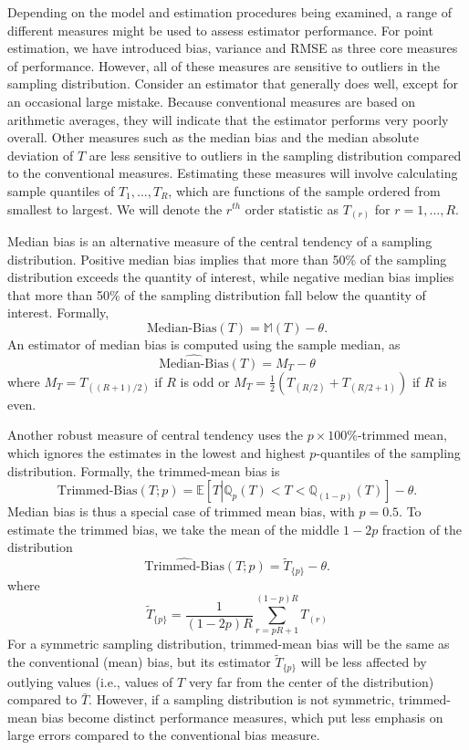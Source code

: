 \documentclass[
]{book}
\newcommand{\E}{\mathbb{E}}
\newcommand{\M}{\mathbb{M}}
\newcommand{\Q}{\mathbb{Q}}
\begin{document}
Depending on the model and estimation procedures being examined, a range of different measures might be used to assess estimator performance.
For point estimation, we have introduced bias, variance and RMSE as three core measures of performance.
However, all of these measures are sensitive to outliers in the sampling distribution.
Consider an estimator that generally does well, except for an occasional large mistake. Because conventional measures are based on arithmetic averages, they will indicate that the estimator performs very poorly overall.
Other measures such as the median bias and the median absolute deviation of \(T\) are less sensitive to outliers in the sampling distribution compared to the conventional measures.
Estimating these measures will involve calculating sample quantiles of \(T_1,...,T_R\), which are functions of the sample ordered from smallest to largest.
We will denote the \(r^{th}\) order statistic as \(T_{(r)}\) for \(r = 1,...,R\).

Median bias is an alternative measure of the central tendency of a sampling distribution.
Positive median bias implies that more than 50\% of the sampling distribution exceeds the quantity of interest, while negative median bias implies that more than 50\% of the sampling distribution fall below the quantity of interest.
Formally,
\[ 
\text{Median-Bias}(T) = \M(T) - \theta 
\label{eq:median-bias}.
\]
An estimator of median bias is computed using the sample median, as
\[
\widehat{\text{Median-Bias}}(T) = M_T - \theta
\label{eq:sample-median-bias}
\]
where \(M_T = T_{((R+1)/2)}\) if \(R\) is odd or \(M_T = \frac{1}{2}\left(T_{(R/2)} + T_{(R/2+1)}\right)\) if \(R\) is even.

Another robust measure of central tendency uses the \(p \times 100\%\)-trimmed mean, which ignores the estimates in the lowest and highest \(p\)-quantiles of the sampling distribution.
Formally, the trimmed-mean bias is
\[
\text{Trimmed-Bias}(T; p) = \E\left[ T \left| \Q_{p}(T) < T < \Q_{(1 - p)}(T) \right.\right] - \theta. 
\label{eq:trimmed-bias}
\]
Median bias is thus a special case of trimmed mean bias, with \(p = 0.5\).
To estimate the trimmed bias, we take the mean of the middle \(1 - 2p\) fraction of the distribution
\[
\widehat{\text{Trimmed-Bias}}(T; p) = \tilde{T}_{\{p\}} - \theta. \label{eq:sample-trimmed-bias}
\]
where
\[
\tilde{T}_{\{p\}} = \frac{1}{(1 - 2p)R} \sum_{r=pR + 1}^{(1-p)R} T_{(r)}
\]
For a symmetric sampling distribution, trimmed-mean bias will be the same as the conventional (mean) bias, but its estimator \(\tilde{T}_{\{p\}}\) will be less affected by outlying values (i.e., values of \(T\) very far from the center of the distribution) compared to \(\bar{T}\).
However, if a sampling distribution is not symmetric, trimmed-mean bias become distinct performance measures, which put less emphasis on large errors compared to the conventional bias measure.
\end{document}
